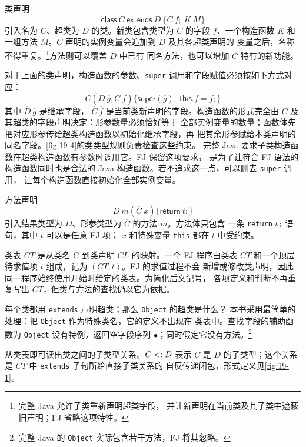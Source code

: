 类声明
\[
\mathsf{class}\ C\ \mathsf{extends}\ D\
\{\overline C\ \overline f;\ K\ \overline M\}
\]
引入名为 \(C\)、超类为 \(D\) 的类。新类包含类型为
\(\overline C\) 的字段 \(\overline f\)、一个构造函数 \(K\) 和一组方法
\(\overline M\)。\(C\) 声明的实例变量会追加到 \(D\) 及其各超类声明的
变量之后，名称不得重复。\footnote{完整 Java 允许子类重新声明超类字段，
并让新声明在当前类及其子类中遮蔽旧声明；FJ 省略这项特性。}方法则可以覆盖 \(D\) 中已有
同名方法，也可以增加 \(C\) 特有的新功能。

对于上面的类声明，构造函数的参数、\texttt{super} 调用和字段赋值必须按如下方式对应：
\[
C(\overline D\ \overline g,\overline C\ \overline f)
\{\mathsf{super}(\overline g);\
  \mathsf{this}.\overline f=\overline f;\}
\]
其中 \(\overline D\ \overline g\) 是继承字段，
\(\overline C\ \overline f\) 是当前类新声明的字段。构造函数的形式完全由
\(C\) 及其超类的字段声明决定：形参数量必须恰好等于
全部实例变量的数量；函数体先把对应形参传给超类构造函数以初始化继承字段，再
把其余形参赋给本类声明的同名字段。\cref{fig:19-4}的类类型规则负责检查这些约束。
完整 Java 要求子类构造函数在超类构造函数有参数时调用它。FJ 保留这项要求，
是为了让符合 FJ 语法的构造函数同时也是合法的 Java 构造函数。若不追求这一点，可以删去 \texttt{super} 调用，
让每个构造函数直接初始化全部实例变量。

方法声明
\[
D\ m(\overline C\ \overline x)\{\mathsf{return}\ t;\}
\]
引入结果类型为 \(D\)、形参类型为 \(\overline C\) 的方法 \(m\)。方法体只包含
一条 \texttt{return} \(t\)\texttt{;} 语句，其中 \(t\) 可以是任意 FJ 项；
\(\overline x\) 和特殊变量 \texttt{this} 都在 \(t\) 中受约束。

类表 \(CT\) 是从类名 \(C\) 到类声明 \(CL\) 的映射。一个 FJ 程序由类表
\(CT\) 和一个顶层待求值项 \(t\) 组成，记为 \((CT,t)\)。FJ 的求值过程不会
新增或修改类声明，因此同一程序始终使用开始时给定的类表。为简化后文记号，
各项定义和判断不再重复写出 \(CT\)，但类与方法的查找仍以它为依据。

每个类都用 \texttt{extends} 声明超类；那么 \texttt{Object} 的超类是什么？
本书采用最简单的处理：把 \texttt{Object} 作为特殊类名，它的定义不出现在
类表中。查找字段的辅助函数为 \texttt{Object} 设有特例，返回空字段序列
\(\bullet\)；同时假定它没有方法。\footnote{完整 Java 的 \texttt{Object}
实际包含若干方法，FJ 将其忽略。}

从类表即可读出类之间的子类型关系。\(C\mathrel{<:} D\) 表示 \(C\) 是 \(D\)
的子类型；这个关系是 \(CT\) 中 \texttt{extends} 子句所给直接子类关系的
自反传递闭包，形式定义见\cref{fig:19-1}。


